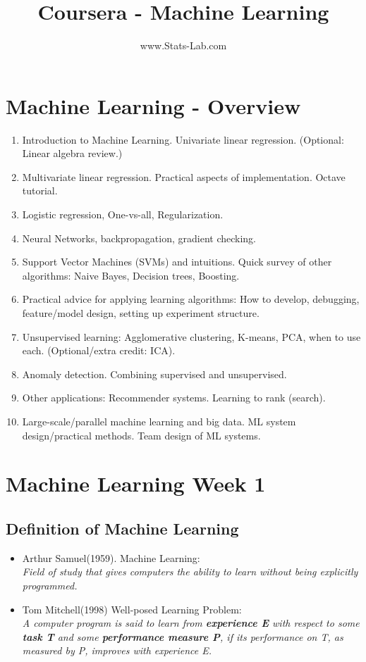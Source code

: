 \documentclass[12pt]{article}
\title{Coursera - Machine Learning}
\author{www.Stats-Lab.com}
\begin{document}
\maketitle


\section{Machine Learning - Overview}

\begin{enumerate}
\item Introduction to Machine Learning. Univariate linear regression. (Optional: Linear algebra review.)
\item Multivariate linear regression. Practical aspects of implementation. Octave tutorial.
\item Logistic regression, One-vs-all, Regularization.
\item Neural Networks, backpropagation, gradient checking.
\item Support Vector Machines (SVMs) and intuitions. Quick survey of other algorithms: Naive Bayes, Decision trees, Boosting.
\item Practical advice for applying learning algorithms: How to develop, debugging, feature/model design, setting up experiment structure.
\item Unsupervised learning: Agglomerative clustering, K-means, PCA, when to use each. (Optional/extra credit: ICA).
\item Anomaly detection. Combining supervised and unsupervised.
\item Other applications: Recommender systems. Learning to rank (search).
\item Large-scale/parallel machine learning and big data. ML system design/practical methods. Team design of ML systems.
\end{enumerate}
\section{Machine Learning Week 1}
\subsection{Definition of Machine Learning}

\begin{itemize}
\item Arthur Samuel(1959). Machine Learning:\\
\textit{Field of study that gives computers the ability to learn without being explicitly programmed.}

\item Tom Mitchell(1998) Well-posed Learning Problem: \\

\textit{A computer program is said to learn from \textbf{experience E} with respect to some \textbf{task T} and some \textbf{performance measure P}, if its performance on T, as measured by P, improves with 
experience E.}
\end{itemize}
\end{document}
